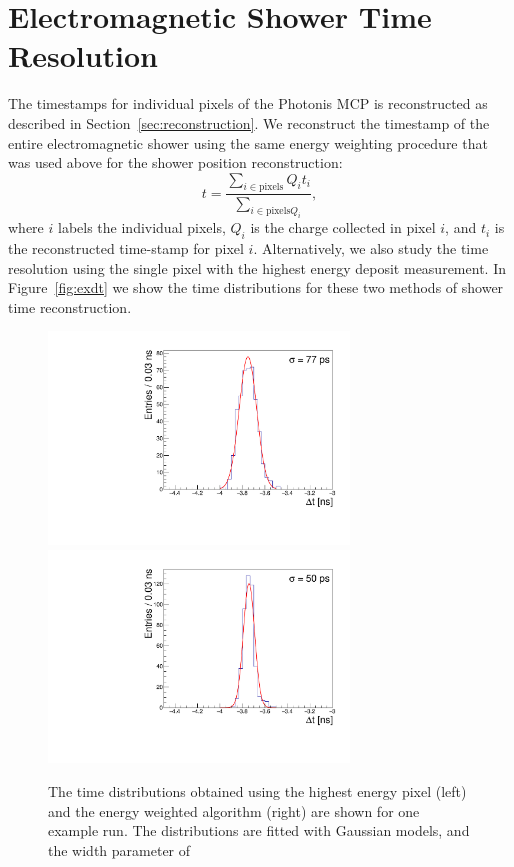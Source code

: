 \documentclass[12pt]{article}
\begin{document}
{\section{ Electromagnetic Shower Time Resolution }
The timestamps for individual pixels of the Photonis MCP is reconstructed as
described in Section~\ref{sec:reconstruction}. We reconstruct the timestamp of
the entire electromagnetic shower using the same energy weighting procedure that
was used above for the shower position reconstruction:
\begin{equation} t =\frac{\sum_{i\in\mathrm{pixels}} Q_{i} t_{i}}
{\sum_{i\in\mathrm{pixels} Q_{i}}}, \label{eqn:EnergyWeightedTimestamp}
\end{equation} where $i$ labels the individual pixels, $Q_{i}$ is the charge
collected in pixel $i$, and $t_{i}$ is the reconstructed time-stamp for pixel
$i$. Alternatively, we also study the time resolution using the single pixel
with the highest energy deposit measurement. In Figure~\ref{fig:exdt} we show
the time distributions for these two methods of shower time reconstruction.
\begin{figure}[htbp]
  \centering
  \includegraphics[width=8cm]{Images/exdt/exdtHI.pdf}
  \includegraphics[width=8cm]{Images/exdt/exdtWI.pdf}
  \caption{\small The time distributions obtained using the highest energy pixel
    (left) and the energy weighted algorithm (right) are shown for one example run.
    The distributions are fitted with Gaussian models, and the width parameter of
}
\end{figure}}
\end{document}
